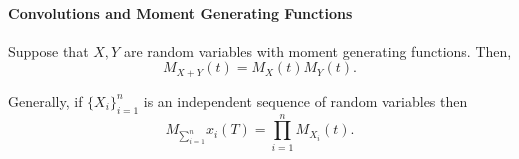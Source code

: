 \paragraph{Convolutions and Moment Generating Functions}
Suppose that \( X, Y \) are random variables with moment
generating functions. Then, \[
    M_{X + Y}(t) = M_X(t) M_Y(t)
.\]

Generally, if \( \{X_i\}_{i=1}^n  \) is an independent sequence of random variables
then  \[
    M_{\sum_{i=1}^n} x_i (T) = \prod_{i=1}^n M_{X_i} (t)
.\]

